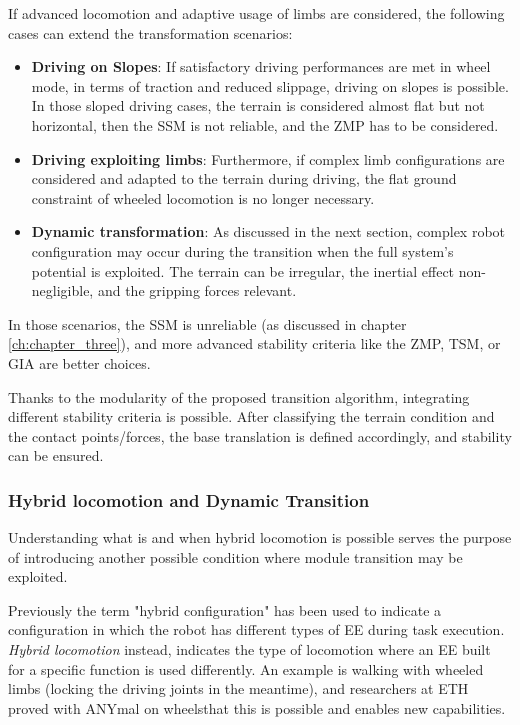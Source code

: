 If advanced locomotion and adaptive usage of limbs are considered, the following cases can extend the  transformation scenarios: 
\begin{itemize}
\setlength\itemsep{-0.7em} 
    \item \textbf{Driving on Slopes}: If satisfactory driving performances are met in wheel mode, in terms of traction and reduced slippage, driving on slopes is possible. In those sloped driving cases, the terrain is considered almost flat but not horizontal, then the SSM is not reliable, and the ZMP has to be considered.   
    \item \textbf{Driving exploiting limbs}: Furthermore, if complex limb configurations are considered and adapted to the terrain during driving, the flat ground constraint of wheeled locomotion is no longer necessary\cite{AnymalDocThesis}\cite{MAMMOTH}\cite{WheelLeggedStabilityOPT}. 
    \item \textbf{Dynamic transformation}: As discussed in the next section, complex robot configuration may occur during the transition when the full system's potential is exploited. 
    The terrain can be irregular, the inertial effect non-negligible, and the gripping forces relevant. 
\end{itemize} 

In those scenarios, the SSM is unreliable (as discussed in chapter \ref{ch:chapter_three}), and more advanced stability criteria like the ZMP, TSM, or GIA are better choices. 

Thanks to the modularity of the proposed transition algorithm, integrating different stability criteria is possible. After classifying the terrain condition and the contact points/forces, the base translation is defined accordingly, and stability can be ensured. 

\subsubsection{Hybrid locomotion and Dynamic Transition}
\label{sec:different_conditions}

Understanding what is and when hybrid locomotion is possible serves the purpose of introducing another possible condition where module transition may be exploited. 

Previously the term "hybrid configuration" has been used to indicate a configuration in which the robot has different types of EE during task execution. \textit{Hybrid locomotion} instead, indicates the type of locomotion where an EE built for a specific function is used differently. An example is walking with wheeled limbs (locking the driving joints in the meantime), and researchers at ETH proved with ANYmal on wheels\cite{AnymalDocThesis}that this is possible and enables new capabilities. 

